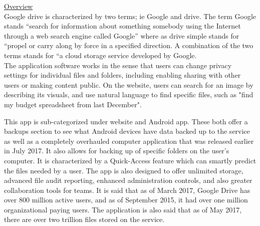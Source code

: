 \documentclass[]{report}
\begin{document}
\begin{flushleft}
\underline{	Overview}\\
	Google drive is characterized by two terms; ie Google and drive. The term Google stands “search for information about something somebody using the Internet through a web search engine called Google” where as drive simple stands for “propel or carry along by force in a specified direction. A combination of the two terms stands for “a cloud storage service developed by Google. \\The application software works in the sense that users can change privacy settings for individual files and folders, including enabling sharing with other users or making content public. On the website, users can search for an image by describing its visuals, and use natural language to find specific files, such as "find my budget spreadsheet from last December".\linebreak
	
	This app is sub-categorized under website and Android app. These both offer a backups section to see what Android devices have data backed up to the service as well as a completely overhauled computer application that was released earlier in July 2017. It also allows for backing up of specific folders on the user's computer. It is characterized by a Quick-Access feature which can smartly predict the files needed by a user. The app is also designed to offer unlimited storage, advanced file audit reporting, enhanced administration controls, and also greater collaboration tools for teams.
	It is said that as of March 2017, Google Drive has over 800 million active users, and as of September 2015, it had over one million organizational paying users. The application is also said that as of May 2017, there are over two trillion files stored on the service.
	
	 
	
	
	
	
	
	
	
	
	
	
	
	
	
	
	
	
	

\end{flushleft}
\end{document}
